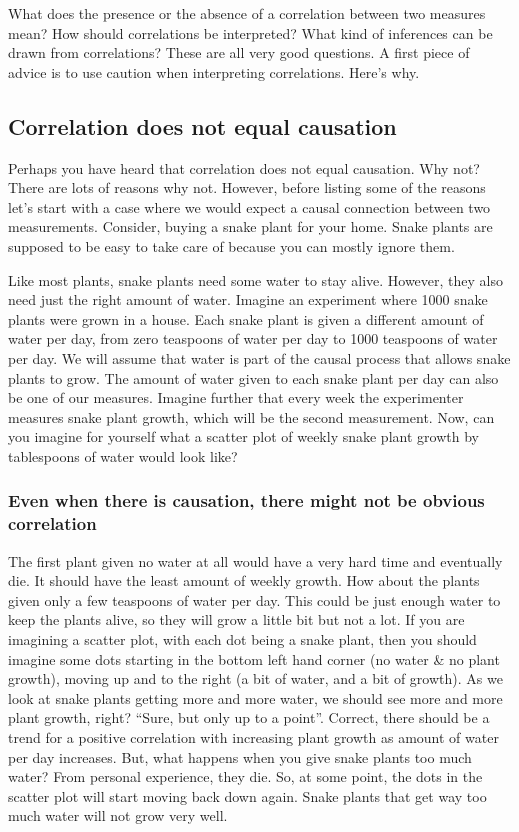 \documentclass[
]{book}
\begin{document}
What does the presence or the absence of a correlation between two measures mean? How should correlations be interpreted? What kind of inferences can be drawn from correlations? These are all very good questions. A first piece of advice is to use caution when interpreting correlations. Here's why.

\subsection{Correlation does not equal causation}\label{correlation-does-not-equal-causation}

Perhaps you have heard that correlation does not equal causation. Why not? There are lots of reasons why not. However, before listing some of the reasons let's start with a case where we would expect a causal connection between two measurements. Consider, buying a snake plant for your home. Snake plants are supposed to be easy to take care of because you can mostly ignore them.

Like most plants, snake plants need some water to stay alive. However, they also need just the right amount of water. Imagine an experiment where 1000 snake plants were grown in a house. Each snake plant is given a different amount of water per day, from zero teaspoons of water per day to 1000 teaspoons of water per day. We will assume that water is part of the causal process that allows snake plants to grow. The amount of water given to each snake plant per day can also be one of our measures. Imagine further that every week the experimenter measures snake plant growth, which will be the second measurement. Now, can you imagine for yourself what a scatter plot of weekly snake plant growth by tablespoons of water would look like?

\subsubsection{Even when there is causation, there might not be obvious correlation}\label{even-when-there-is-causation-there-might-not-be-obvious-correlation}

The first plant given no water at all would have a very hard time and eventually die. It should have the least amount of weekly growth. How about the plants given only a few teaspoons of water per day. This could be just enough water to keep the plants alive, so they will grow a little bit but not a lot. If you are imagining a scatter plot, with each dot being a snake plant, then you should imagine some dots starting in the bottom left hand corner (no water \& no plant growth), moving up and to the right (a bit of water, and a bit of growth). As we look at snake plants getting more and more water, we should see more and more plant growth, right? ``Sure, but only up to a point''. Correct, there should be a trend for a positive correlation with increasing plant growth as amount of water per day increases. But, what happens when you give snake plants too much water? From personal experience, they die. So, at some point, the dots in the scatter plot will start moving back down again. Snake plants that get way too much water will not grow very well.
\end{document}
